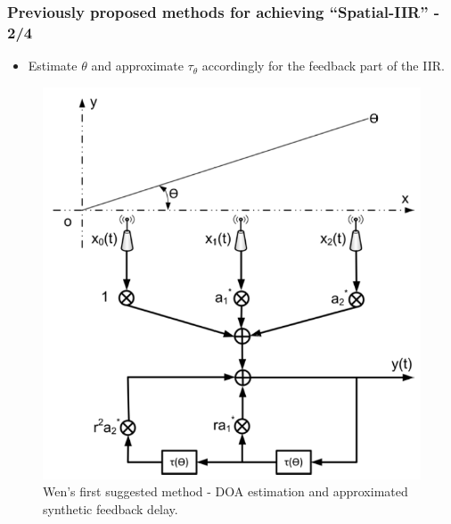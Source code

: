 \documentclass[10pt,pdflatex,headrule,landscape]{beamer}
\begin{document}
\begin{frame}
\frametitle{Previously proposed methods for achieving ``Spatial-IIR'' - 2/4}
\begin{minipage}{0.55\textwidth}
\begin{itemize}
\item
{
Estimate $ \theta $ and approximate $ \tau_{\theta} $ accordingly for the feedback part of the IIR. 
}
\end{itemize}
\end{minipage}
\begin{minipage}{0.44\textwidth}
\begin{figure}
\includegraphics[width=\textwidth]{Media/WenFirstSuggestedMethod.PNG}
\caption{Wen's first suggested method - DOA estimation and approximated synthetic feedback delay.}
\end{figure}
\end{minipage}
\end{frame}
\end{document}
